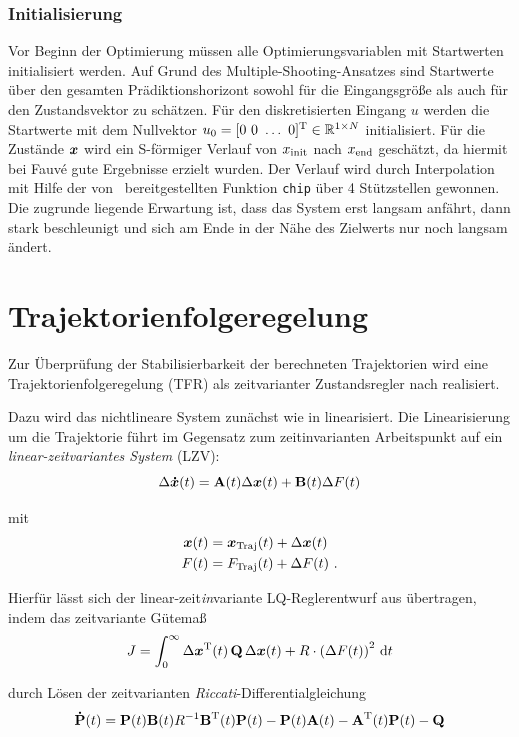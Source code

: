 \subsubsection{Initialisierung}
Vor Beginn der Optimierung müssen alle Optimierungsvariablen mit Startwerten initialisiert werden. Auf Grund des Multiple-Shooting-Ansatzes sind Startwerte über den gesamten Prädiktionshorizont sowohl für die Eingangsgröße als auch für den Zustandsvektor zu schätzen. Für den diskretisierten Eingang $u$ werden die Startwerte mit dem Nullvektor $u_0 = [0 \ 0 \ \ldots \ 0 ]^{\mathrm{T}} \in \mathbb{R}^{1 \times N}$ initialisiert. Für die Zustände $\boldsymbol{x}$ wird ein S-förmiger Verlauf von $x_{\mathrm{init}}$ nach $x_{\mathrm{end}}$ geschätzt, da hiermit bei Fauvé \cite{fauve} gute Ergebnisse erzielt wurden. Der Verlauf wird durch Interpolation mit Hilfe der von \Matlab\ bereitgestellten Funktion \texttt{chip} über 4  Stützstellen gewonnen. Die zugrunde liegende Erwartung ist, dass das System erst langsam anfährt, dann stark beschleunigt und sich am Ende in der Nähe des Zielwerts nur noch langsam ändert.



\section{Trajektorienfolgeregelung}\label{sec:tfr}

Zur Überprüfung der Stabilisierbarkeit der berechneten Trajektorien wird eine Trajektorienfolgeregelung (TFR) als zeitvarianter Zustandsregler nach \cite{matPrakt2} realisiert. 

Dazu wird das nichtlineare System zunächst wie in  linearisiert. Die Linearisierung um die Trajektorie führt im Gegensatz zum zeitinvarianten Arbeitspunkt auf ein \emph{linear-zeitvariantes System} (LZV):
	\[
	\Delta \boldsymbol{\dot{x}}(t) = {\boldsymbol{\mathrm{A}}}(t) \Delta \boldsymbol{x}(t) + {\boldsymbol{\mathrm{B}}}(t) \Delta F(t)
\]

mit 
\begin{align*}
	\boldsymbol{x}(t) &= \boldsymbol{x}_{\mathrm{Traj}}(t) + \Delta \boldsymbol{x}(t) \\
	 F(t) &= F_{\mathrm{Traj}}(t) + \Delta F(t) \ .
\end{align*}

Hierfür lässt sich der linear-zeit\emph{in}variante LQ-Reglerentwurf aus  übertragen, indem das zeitvariante Gütemaß 
	\[
	J = \int_{0}^{\infty} \Delta \boldsymbol{x}^{\mathrm{T}}(t) \, {\boldsymbol{\mathrm{Q}}} \, \Delta \boldsymbol{x}(t) + R \cdot \left(\Delta F(t)\right)^2 \, \mathrm{d} t
\]

durch Lösen der zeitvarianten \emph{Riccati}-Differentialgleichung
	\[
	{\boldsymbol{\mathrm{\dot{P}}}}(t) = {\boldsymbol{\mathrm{P}}}(t) {\boldsymbol{\mathrm{B}}}(t) R^{-1} {\boldsymbol{\mathrm{B}}}^{\mathrm{T}}(t) {\boldsymbol{\mathrm{P}}}(t) - {\boldsymbol{\mathrm{P}}}(t) {\boldsymbol{\mathrm{A}}}(t) - {\boldsymbol{\mathrm{A}}}^{\mathrm{T}}(t) {\boldsymbol{\mathrm{P}}}(t) - {\boldsymbol{\mathrm{Q}}}
\]


